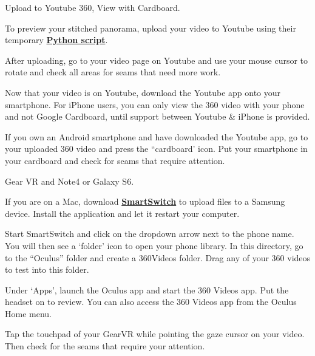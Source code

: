 \begin{fullwidth}
\clearpage
{\large Upload to Youtube 360, View with Cardboard. \par}

To preview your stitched panorama, upload your video to Youtube using their temporary \textbf{\href{https://www.youtube.com/watch?v=Z8VlD2rtACA}{Python script}}.

After uploading, go to your video page on Youtube and use your mouse cursor to rotate and check all areas for seams that need more work.

Now that your video is on Youtube, download the Youtube app onto your smartphone. For iPhone users, you can only view the 360 video with your phone and not Google Cardboard, until support between Youtube & iPhone is provided.

If you own an Android smartphone and have downloaded the Youtube app, go to your uploaded 360 video and press the “cardboard’ icon. Put your smartphone in your cardboard and check for seams that require attention.

{\large Gear VR and Note4 or Galaxy S6. \par}

If you are on a Mac, download \textbf{\href{https://www.dropbox.com/sh/8kqte3wtyt3vltu/AAAjUnNxtXhaxprWF8_q9zbCa?dl=0}{SmartSwitch}} to upload files to a Samsung device. Install the application and let it restart your computer.

Start SmartSwitch and click on the dropdown arrow next to the phone name. You will then see a ‘folder’ icon to open your phone library. In this directory, go to the “Oculus” folder and create a 360Videos folder. Drag any of your 360 videos to test into this folder.


\clearpage

Under ‘Apps’, launch the Oculus app and start the 360 Videos app. Put the headset on to review. You can also access the 360 Videos app from the Oculus Home menu.


Tap the touchpad of your GearVR while pointing the gaze cursor on your video. Then check for the seams that require your attention.

\clearpage
\end{fullwidth}